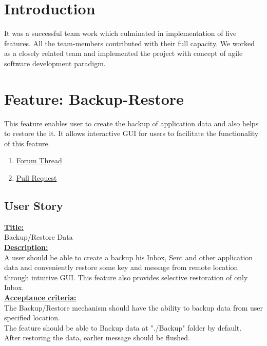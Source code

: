 \documentclass[12pt]{article}
\begin{document}
\maketitle

\section{Introduction}
It was a successful team work which culminated in implementation of five features. All the team-members contributed with their full capacity. We worked as a closely related team and implemented the project with concept of agile software development paradigm. 

 

\section{Feature: Backup-Restore}
This feature enables user to create the backup of application data and also helps to restore the it. It allows interactive GUI for users to facilitate the functionality of this feature. 

\begin{enumerate}
\item \href{https://bitmessage.org/forum/index.php/topic,3306.0.html}{Forum Thread} 
\item \href{https://github.com/Bitmessage/PyBitmessage/pull/554}{Pull Request}
\end{enumerate}

\subsection{User Story}
\underline{\bf{Title:}} \\ Backup/Restore Data\\
\underline{\bf{Description:}}\\
A user should be able to create a backup his Inbox, Sent and other application data and conveniently restore some key and message from remote location through intuitive GUI. This feature also provides selective restoration of only Inbox. \\
\underline{\bf{Acceptance criteria:}}\\
The Backup/Restore mechanism should have the ability to backup data from user specified location.\\
The feature should be able to Backup data at "./Backup" folder by default.\\
After restoring the data, earlier message should be flushed.\\
\end{document}
